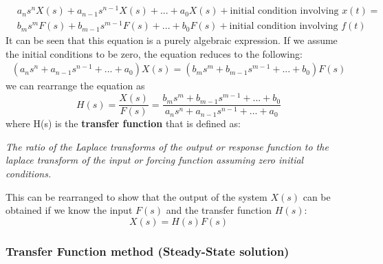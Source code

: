 \documentclass[12pt,letter]{article}
\numberwithin{ex}{section} %
\begin{document}
\begin{eqnarray}
&a_ns^nX(s) + a_{n-1}s^{n-1}X(s) + ... + a_0X(s) + \text{initial condition involving } x(t) =   \\
&b_ms^mF(s) + b_{m-1}s^{m-1}F(s) + ... + b_0F(s) + \text{initial condition involving } f(t)  \nonumber
\end{eqnarray}
It can be seen that this equation is a purely algebraic expression. If we assume the initial conditions to be zero, the equation reduces to the following:
\begin{eqnarray}
(a_ns^n + a_{n-1}s^{n-1} + ... + a_0)X(s) =  (b_ms^m + b_{m-1}s^{m-1} + ... + b_0)F(s) 
\end{eqnarray}
we can rearrange the equation as 
\begin{equation}
H(s) = \frac{X(s)}{F(s)} = \frac{b_ms^m + b_{m-1}s^{m-1} + ... + b_0}{a_ns^n + a_{n-1}s^{n-1} + ... + a_0}
\end{equation}
where H(s) is the \textbf{transfer function} that is defined as:

\textit{The ratio of the Laplace transforms of the output or response function to the laplace transform of the input or forcing function assuming zero initial conditions.}

This can be rearranged to show that the output of the system $X(s)$ can be obtained if we know the input $F(s)$ and the transfer function $H(s)$:
\begin{equation}
X(s) = H(s)F(s)
\end{equation}	


\subsubsection{Transfer Function method (Steady-State solution)}
\end{document}
